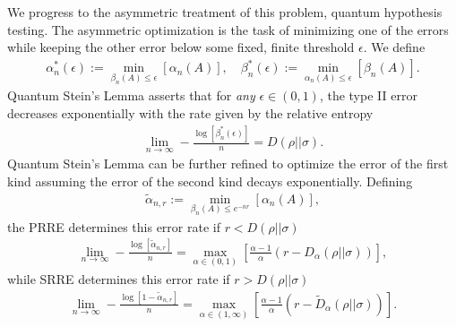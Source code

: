 \documentclass[a4paper,11pt]{article}
\newcommand*{\SR}[1]{\textcolor{magenta}{[SR: \textsf{#1}]}}
\begin{document}
We progress to the asymmetric treatment of this problem, quantum hypothesis testing. The asymmetric optimization is the task of minimizing one of the errors while keeping the other error below some fixed, finite threshold $\epsilon$. We define
\begin{align}
    \alpha_n^*(\epsilon) := \min_{\beta_n(A) \leq \epsilon}\left[\alpha_n(A) \right], \quad \beta_n^*(\epsilon) := \min_{\alpha_n(A) \leq \epsilon}\left[\beta_n(A) \right].
\end{align}
Quantum Stein's Lemma \cite{cmp/1104248844,2005atqs.book...28O} asserts that for \textit{any} $\epsilon \in (0,1)$, the type II error decreases exponentially with the rate given by the relative entropy
\begin{align}
    \lim_{n\rightarrow \infty} -\frac{\log\left[ \beta_n^*(\epsilon)\right]}{n} = D(\rho || \sigma).
\end{align}
Quantum Stein's Lemma can be further refined to optimize the error of the first kind assuming the error of the second kind decays exponentially. Defining
\begin{align}
    \tilde{\alpha}_{n,r} := \min_{\beta_n(A) \leq e^{-nr}}\left[\alpha_n(A) \right],
\end{align}
the PRRE determines 
this error rate if $r < D(\rho || \sigma)$ \cite{2007PhRvA..76f2301H,2006quant.ph.11289N,2009arXiv0912.1286M}
\begin{align}
    \lim_{n \rightarrow \infty} -\frac{\log\left[\tilde{\alpha}_{n,r}\right]}{n} = \max_{\alpha \in (0,1)}\left[ \frac{\alpha - 1}{\alpha} \left( r- D_{\alpha}(\rho || \sigma)\right)\right],
\end{align}
while SRRE determines 
this error rate if $r > D(\rho || \sigma)$ \cite{2015CMaPh.334.1617M}
\begin{align}
    \lim_{n \rightarrow \infty} -\frac{\log\left[1-\tilde{\alpha}_{n,r}\right]}{n} = \max_{\alpha \in (1,\infty)}\left[ \frac{\alpha - 1}{\alpha} \left( r- \tilde{D}_{\alpha}(\rho || \sigma)\right)\right].
\end{align}

\end{document}

